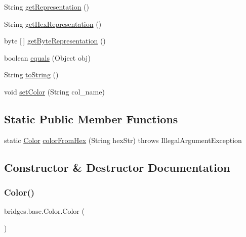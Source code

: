 \begin{DoxyCompactItemize}
\item 
String \hyperlink{classbridges_1_1base_1_1_color_a2f9b0cb588e49b2ebf2f015d4d7507d0}{get\+Representation} ()
\item 
String \hyperlink{classbridges_1_1base_1_1_color_aced9bc89248b85686ba5385472974fe6}{get\+Hex\+Representation} ()
\item 
byte \mbox{[}$\,$\mbox{]} \hyperlink{classbridges_1_1base_1_1_color_a07215c888a6d17374a3d862ff30d5f93}{get\+Byte\+Representation} ()
\item 
boolean \hyperlink{classbridges_1_1base_1_1_color_a81fb4cb13c05a3da2f29f48b07189e7c}{equals} (Object obj)
\item 
String \hyperlink{classbridges_1_1base_1_1_color_a62e7406ca7d36ed755c28a86376328ba}{to\+String} ()
\item 
void \hyperlink{classbridges_1_1base_1_1_color_a54dcd31227bde0f5d0a4f5d3b5a24ed2}{set\+Color} (String col\+\_\+name)
\end{DoxyCompactItemize}
\subsection*{Static Public Member Functions}
\begin{DoxyCompactItemize}
\item 
static \hyperlink{classbridges_1_1base_1_1_color}{Color} \hyperlink{classbridges_1_1base_1_1_color_a94e599a1562275e7f04e337ba109b19c}{color\+From\+Hex} (String hex\+Str)  throws Illegal\+Argument\+Exception 
\end{DoxyCompactItemize}


\subsection{Constructor \& Destructor Documentation}
\mbox{\label{classbridges_1_1base_1_1_color_ab6d71ac2ee1430fb2db2fbe34e692de8}} 
\subsubsection{\texorpdfstring{Color()}{Color()}\hspace{0.1cm}{\footnotesize\ttfamily [1/4]}}
{\footnotesize\ttfamily bridges.\+base.\+Color.\+Color (\begin{DoxyParamCaption}{ }\end{DoxyParamCaption})}

